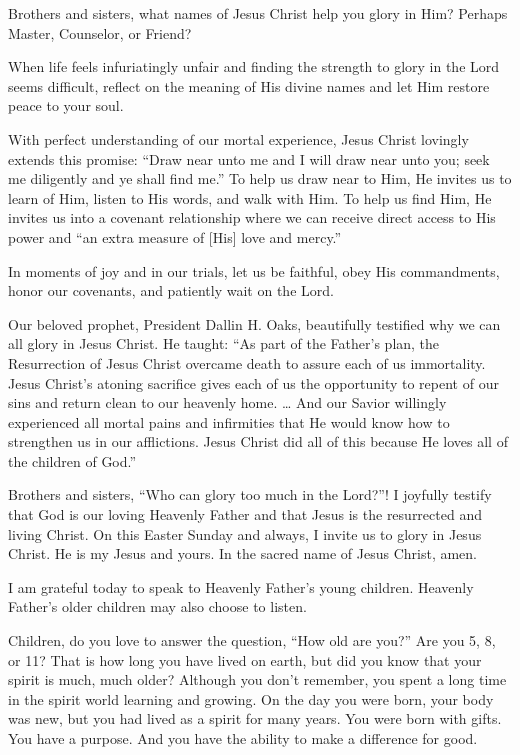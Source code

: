 \documentclass[letterpaper, 11pt]{report}
\newcommand{\speaker}{}
\newcommand{\talk}{}
\newcommand{\talkdatestr}{}
\newcommand{\setspeaker}[1]{\renewcommand{\speaker}{#1}}
\newcommand{\settalk}[1]{\renewcommand{\talk}{#1}}
\newcommand{\talkheading}[2]{%
    \vspace{1em}
    \noindent{\huge\bfseries #1}
    \par\nopagebreak\vspace{0.25em}
    \noindent{\normalsize\bfseries #2\ifx\talkdatestr\empty\else,\ \talkdatestr\fi}
    \par\nopagebreak\vspace{0.5em}
}
\begin{document}
Brothers and sisters, what names of Jesus Christ help you glory in Him? Perhaps Master, Counselor, or Friend?

When life feels infuriatingly unfair and finding the strength to glory in the Lord seems difficult, reflect on the meaning of His divine names and let Him restore peace to your soul.

With perfect understanding of our mortal experience, Jesus Christ lovingly extends this promise: “Draw near unto me and I will draw near unto you; seek me diligently and ye shall find me.” To help us draw near to Him, He invites us to learn of Him, listen to His words, and walk with Him. To help us find Him, He invites us into a covenant relationship where we can receive direct access to His power and “an extra measure of [His] love and mercy.”

In moments of joy and in our trials, let us be faithful, obey His commandments, honor our covenants, and patiently wait on the Lord.

Our beloved prophet, President Dallin H. Oaks, beautifully testified why we can all glory in Jesus Christ. He taught: “As part of the Father’s plan, the Resurrection of Jesus Christ overcame death to assure each of us immortality. Jesus Christ’s atoning sacrifice gives each of us the opportunity to repent of our sins and return clean to our heavenly home. … And our Savior willingly experienced all mortal pains and infirmities that He would know how to strengthen us in our afflictions. Jesus Christ did all of this because He loves all of the children of God.”

Brothers and sisters, “Who can glory too much in the Lord?”! I joyfully testify that God is our loving Heavenly Father and that Jesus is the resurrected and living Christ. On this Easter Sunday and always, I invite us to glory in Jesus Christ. He is my Jesus and yours. In the sacred name of Jesus Christ, amen.

\newpage
\settalk{“Here Am I, Send Me”}
\setspeaker{Susan H. Porter}
\talkheading{“Here Am I, Send Me”}{Susan H. Porter}

I am grateful today to speak to Heavenly Father’s young children. Heavenly Father’s older children may also choose to listen.

Children, do you love to answer the question, “How old are you?” Are you 5, 8, or 11? That is how long you have lived on earth, but did you know that your spirit is much, much older? Although you don’t remember, you spent a long time in the spirit world learning and growing. On the day you were born, your body was new, but you had lived as a spirit for many years. You were born with gifts. You have a purpose. And you have the ability to make a difference for good.
\end{document}
